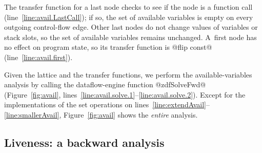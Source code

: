 \documentclass[blockstyle,preprint,nocopyrightspace]{sigplanconf}
\newcommand\lineref[1]{line~\ref{line:#1}}
\newcommand\linerangeref[2]{\mbox{lines~\ref{line:#1}--\ref{line:#2}}}
\newcommand\figref[1]{Figure~\ref{fig:#1}}
\begin{document}
The transfer function for a last node checks to see if the node is a
function call (\lineref{avail.LastCall}); if so, the set of
available variables is empty on every outgoing control-flow edge.
Other last nodes do not change values of variables or stack slots, 
so the set of available variables remains unchanged.
%
A~first node has no effect on program state, so its transfer function
is @flip const@ (\lineref{avail.first}).


Given the lattice and the transfer functions,
we perform the available-variables analysis by calling
the dataflow-engine function @zdfSolveFwd@ (\figref{avail},
\linerangeref{avail.solve.1}{avail.solve.2}). 
Except for the implementations of the set operations on
\linerangeref{extendAvail}{smallerAvail}, 
\figref{avail} shows the \emph{entire} analysis.

\subsection{Liveness: a backward analysis} 
\end{document}
